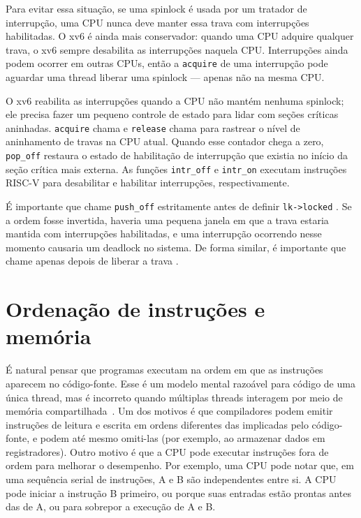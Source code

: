 Para evitar essa situação, se uma spinlock é usada por um tratador de interrupção,
uma CPU nunca deve manter essa trava com interrupções habilitadas.
O xv6 é ainda mais conservador: quando uma CPU adquire qualquer
trava, o xv6 sempre desabilita as interrupções naquela CPU.
Interrupções ainda podem ocorrer em outras CPUs, então
a \lstinline{acquire} de uma interrupção
pode aguardar uma thread liberar uma spinlock — apenas não na mesma CPU.

O xv6 reabilita as interrupções quando a CPU não mantém nenhuma spinlock; ele precisa
fazer um pequeno controle de estado para lidar com seções críticas aninhadas.
\lstinline{acquire}
chama
e
\lstinline{release}
chama
para rastrear o nível de aninhamento de travas na CPU atual.
Quando esse contador chega a zero,
\lstinline{pop_off}
restaura o estado de habilitação de interrupção que existia
no início da seção crítica mais externa.
As funções
\lstinline{intr_off}
e
\lstinline{intr_on}
executam instruções RISC-V para desabilitar e habilitar
interrupções, respectivamente.

É importante que
chame
\lstinline{push_off}
estritamente antes de definir
\lstinline{lk->locked}
.
Se a ordem fosse invertida, haveria
uma pequena janela em que a trava
estaria mantida com interrupções habilitadas, e
uma interrupção ocorrendo nesse momento causaria um deadlock no sistema.
De forma similar, é importante que
chame
apenas depois de
liberar a trava
.

\section{Ordenação de instruções e memória}

É natural pensar que programas executam na ordem
em que as instruções aparecem no código-fonte.
Esse é um modelo mental razoável para código de uma única thread,
mas é incorreto quando
múltiplas threads interagem por meio de memória compartilhada~\cite{riscv:user,boehm04}.
Um dos motivos é que compiladores podem emitir instruções de leitura e escrita
em ordens diferentes das implicadas pelo código-fonte, e podem até mesmo omiti-las
(por exemplo, ao armazenar dados em registradores).
Outro motivo é que a CPU pode executar instruções fora de ordem para melhorar o desempenho.
Por exemplo, uma CPU pode notar que, em uma sequência serial de instruções,
A e B são independentes entre si.
A CPU pode iniciar a instrução B primeiro, ou porque suas
entradas estão prontas antes das de A, ou para sobrepor
a execução de A e B.

